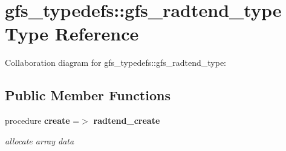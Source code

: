 \section{gfs\+\_\+typedefs\+:\+:gfs\+\_\+radtend\+\_\+type Type Reference}
\label{structgfs__typedefs_1_1gfs__radtend__type}


Collaboration diagram for gfs\+\_\+typedefs\+:\+:gfs\+\_\+radtend\+\_\+type\+:
\subsection*{Public Member Functions}
\begin{DoxyCompactItemize}
\item 
procedure \textbf{ create} =$>$ \textbf{ radtend\+\_\+create}
\begin{DoxyCompactList}\small\item\em allocate array data \end{DoxyCompactList}\end{DoxyCompactItemize}
